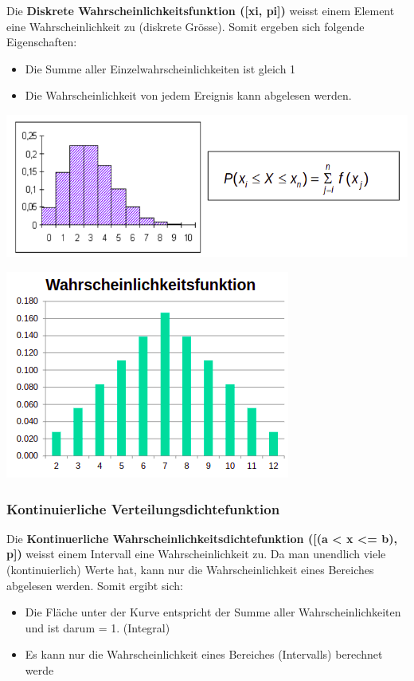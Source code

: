 Die \textbf{Diskrete Wahrscheinlichkeitsfunktion ([xi, pi])} weisst einem Element eine Wahrscheinlichkeit zu (diskrete Grösse).
Somit ergeben sich folgende Eigenschaften:
\begin{itemize}
    \item Die Summe aller Einzelwahrscheinlichkeiten ist gleich 1
    \item Die Wahrscheinlichkeit von jedem Ereignis kann abgelesen werden.
\end{itemize}


\begin{minipage}[t]{0.6\textwidth}
\centering
\includegraphics[width=0.9\linewidth]{images/diskrete_wahrscheinlichkeitsfunktion.png}
\end{minipage}
\begin{minipage}[t]{0.325\textwidth}
\centering
\includegraphics[width=0.9\linewidth]{images/wahrscheinlichkeitsfunktion.png}
\end{minipage}

\subsubsection{Kontinuierliche Verteilungsdichtefunktion }
Die \textbf{Kontinuerliche Wahrscheinlichkeitsdichtefunktion ([(a < x <= b), p])} weisst einem Intervall eine Wahrscheinlichkeit zu.
Da man unendlich viele (kontinuierlich) Werte hat, kann nur die Wahrscheinlichkeit eines Bereiches abgelesen werden.
Somit ergibt sich:
\begin{itemize}
    \item Die Fläche unter der Kurve entspricht der Summe aller Wahrscheinlichkeiten und ist darum = 1. (Integral)
    \item Es kann nur die Wahrscheinlichkeit eines Bereiches (Intervalls) berechnet werde
\end{itemize}

